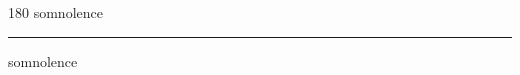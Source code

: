 
\begin{frame}
\begin{center}
\begin{turn}{180}
{\fontsize{2.5cm}{1em}\selectfont somnolence}
\end{turn}
\vspace{1em}\par  
\hrule
\vspace{1em}\par  
{\fontsize{2.5cm}{1em}\selectfont somnolence}
\end{center}
\end{frame}
